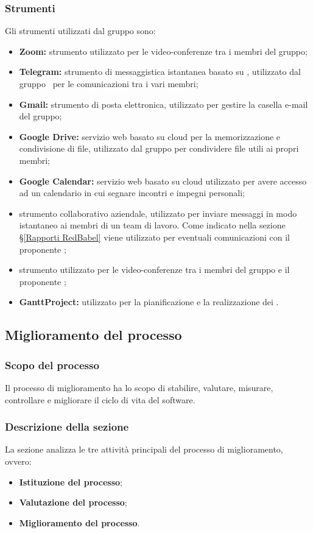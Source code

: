 \subsubsection{Strumenti}
Gli strumenti utilizzati dal gruppo sono:
\begin{itemize}
	\item \textbf{Zoom:} strumento utilizzato per le video-conferenze tra i membri del gruppo;
	\item \textbf{Telegram:} strumento di messaggistica istantanea basato su , utilizzato dal gruppo \Gruppo\ per le comunicazioni tra i vari membri;
	\item \textbf{Gmail:} strumento  di posta elettronica, utilizzato per gestire la casella e-mail del gruppo;
	\item \textbf{Google Drive:} servizio web basato su cloud per la memorizzazione e condivisione di file, utilizzato dal gruppo per condividere file utili ai propri membri;
	\item \textbf{Google Calendar:} servizio web basato su cloud utilizzato per avere accesso ad un calendario in cui segnare incontri e impegni personali;
	\item {} strumento collaborativo aziendale, utilizzato per inviare messaggi in modo istantaneo ai membri di un team di lavoro. Come indicato nella sezione \S\ref{Rapporti RedBabel} viene utilizzato per eventuali comunicazioni con il proponente \Proponente;
	\item {} strumento utilizzato per le video-conferenze tra i membri del gruppo e il proponente \Proponente;
	\item \textbf{GanttProject:} utilizzato per la pianificazione e la realizzazione dei .
\end{itemize}

\subsection{Miglioramento del processo}
\subsubsection{Scopo del processo}
Il processo di miglioramento ha lo scopo di stabilire, valutare, misurare, controllare e migliorare il ciclo di vita del software.
\subsubsection{Descrizione della sezione}
La sezione analizza le tre attività principali del processo di miglioramento, ovvero:
\begin{itemize}
	\item \textbf{Istituzione del processo};	
	\item \textbf{Valutazione del processo};
	\item \textbf{Miglioramento del processo}.
\end{itemize}
